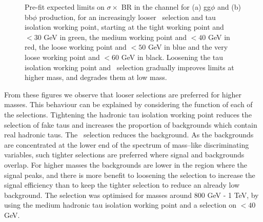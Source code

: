 \begin{figure}[h!]
\begin{center}
\end{center}
\caption{Pre-fit expected limits on $\sigma \times$ BR in the \mutau channel for (a) gg$\phi$ and
(b) bb$\phi$ production, for an increasingly looser \mT~selection and tau isolation working point, starting
at the tight working point and \mT$<30$ GeV in green, the medium working point and \mT$<40$ GeV in red,
the loose working point and \mT$<50$ GeV in blue and the very loose working point and \mT$<60$ GeV in black. Loosening
the tau isolation working point and \mT~selection gradually improves limits at higher mass, and
degrades them at low mass.}
\label{fig:mssm_gradcuts_mt}
\end{figure}

From these figures
we observe that looser selections are preferred for higher masses. This behaviour can be
explained by considering the function of each of the selections. Tightening the hadronic
tau isolation working point reduces the selection of fake taus and increases the proportion
of backgrounds which contain real hadronic taus. The \mT~selection reduces
the \Wjets background. As the backgrounds are concentrated at the lower
end of the spectrum of mass--like discriminating variables, such tighter
selections are preferred where signal and backgrounds overlap. For higher masses the
backgrounds are lower in the region where the signal peaks,
and there is more benefit to loosening the selection
to increase the signal efficiency than to keep the tighter selection
to reduce an already low background.
The selection was optimised for masses around 800 GeV - 1 TeV, by
using the medium hadronic tau isolation working point and a selection on \mT$<40$ GeV.

